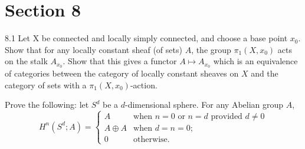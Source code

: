 \newpage
\section*{Section 8}
8.1 Let X be connected and locally simply connected, and choose a base point $x_0$. Show that for any locally constant sheaf (of sets) $A$, the group $\pi_1(X,x_0)$ acts on the stalk $A_{x_0}$. Show that this gives a functor $A \mapsto A_{x_0}$ which is an equivalence of categories between the category of locally constant sheaves on $X$ and the category of sets with a $\pi_1(X,x_0)$-action. 

 Prove the following: let $S^d$ be a $d$-dimensional sphere. For any Abelian group $A$, 
\[
H^n(S^d;A)= \begin{cases} A & \text{when } n=0 \text{ or } n=d \text{ provided } d \neq 0 \\ A \oplus A & \text{when } d =n=0;\\ 0 & \text{otherwise}.
\end{cases}
\]

